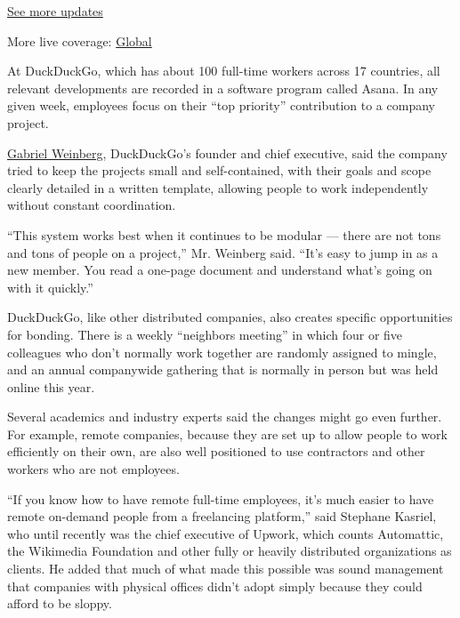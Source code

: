 \href{https://www.nytimes3xbfgragh.onion/live/2020/07/31/business/stock-market-today-coronavirus?action=click\&pgtype=Article\&state=default\&region=MAIN_CONTENT_1\&context=storylines_live_updates}{See
more updates}

More live coverage:
\href{https://www.nytimes3xbfgragh.onion/2020/08/01/world/coronavirus-covid-19.html?action=click\&pgtype=Article\&state=default\&region=MAIN_CONTENT_1\&context=storylines_live_updates}{Global}

At DuckDuckGo, which has about 100 full-time workers across 17
countries, all relevant developments are recorded in a software program
called Asana. In any given week, employees focus on their ``top
priority'' contribution to a company project.

\href{https://www.nytimes3xbfgragh.onion/2019/07/15/technology/duckduckgo-private-search.html}{Gabriel
Weinberg}, DuckDuckGo's founder and chief executive, said the company
tried to keep the projects small and self-contained, with their goals
and scope clearly detailed in a written template, allowing people to
work independently without constant coordination.

``This system works best when it continues to be modular --- there are
not tons and tons of people on a project,'' Mr. Weinberg said. ``It's
easy to jump in as a new member. You read a one-page document and
understand what's going on with it quickly.''

DuckDuckGo, like other distributed companies, also creates specific
opportunities for bonding. There is a weekly ``neighbors meeting'' in
which four or five colleagues who don't normally work together are
randomly assigned to mingle, and an annual companywide gathering that is
normally in person but was held online this year.

Several academics and industry experts said the changes might go even
further. For example, remote companies, because they are set up to allow
people to work efficiently on their own, are also well positioned to use
contractors and other workers who are not employees.

``If you know how to have remote full-time employees, it's much easier
to have remote on-demand people from a freelancing platform,'' said
Stephane Kasriel, who until recently was the chief executive of Upwork,
which counts Automattic, the Wikimedia Foundation and other fully or
heavily distributed organizations as clients. He added that much of what
made this possible was sound management that companies with physical
offices didn't adopt simply because they could afford to be sloppy.

